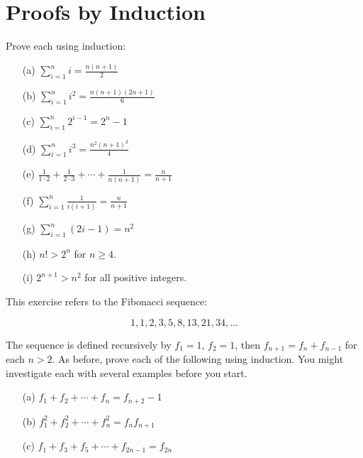 \documentclass[11pt,paper=b5,footinclude,headinclude]{scrbook} %
\theoremstyle{remark}
\theoremstyle{definition} %
\theoremstyle{theorem} %
\newtheorem{ex}{Exercise\hypertarget{sol:\theex}}[chapter]
\begin{document}
\section{Proofs by Induction}



    \begin{ex} Prove each using induction:
    \begin{enumerate}
        \item[(a)] $\sum_{i=1}^n i = \frac{n(n + 1)}{2}$
        \item[(b)] $\sum_{i=1}^n i^2 = \frac{n(n + 1)(2n + 1)}{6}$
        \item[(c)] $\sum_{i=1}^n 2^{i-1} = 2^n - 1$
        \item[(d)] $\sum_{i=1}^n i^3 = \frac{n^2(n + 1)^2}{4}$
        \item[(e)] $\frac{1}{1 \cdot 2} + \frac{1}{2 \cdot 3} + \cdots + \frac{1}{n(n + 1)} = \frac{n}{n + 1}$
        \item[(f)] $\sum_{i=1}^n \frac{1}{i(i + 1)} = \frac{n}{n + 1}$
        \item[(g)] $\sum_{i=1}^n (2i - 1) = n^2$
        \item[(h)] $n! > 2^n$ for $n \geq 4$.
        \item[(i)] $2^{n+1} > n^2$ for all positive integers.
    \end{enumerate}
    \end{ex} \begin{ex} This exercise refers to the Fibonacci sequence:

\[
1, 1, 2, 3, 5, 8, 13, 21, 34, \ldots
\]

The sequence is defined recursively by $f_1 = 1$, $f_2 = 1$, then $f_{n+1} = f_n + f_{n-1}$ for each $n > 2$. As before, prove each of the following using induction. You might investigate each with several examples before you start.
    \begin{enumerate}
        \item[(a)] $f_1 + f_2 + \cdots + f_n = f_{n+2} - 1$
        \item[(b)] $f_1^2 + f_2^2 + \cdots + f_n^2 = f_n f_{n+1}$
        \item[(c)] $f_1 + f_3 + f_5 + \cdots + f_{2n-1} = f_{2n}$
    \end{enumerate}
    \end{ex}
\end{document}
